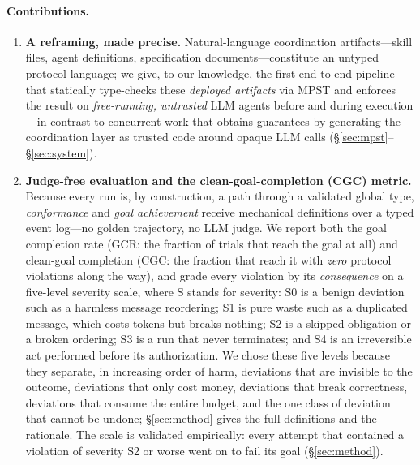 \documentclass{article}
\begin{document}
\paragraph{Contributions.}
\begin{enumerate}\itemsep2pt
\item \textbf{A reframing, made precise.} Natural-language coordination artifacts---skill files, agent definitions, specification documents---constitute an untyped protocol language; we give, to our knowledge, the first end-to-end pipeline that statically type-checks these \emph{deployed artifacts} via MPST and enforces the result on \emph{free-running, untrusted} LLM agents before and during execution---in contrast to concurrent work that obtains guarantees by generating the coordination layer as trusted code around opaque LLM calls \citep{bollig26} (\S\ref{sec:mpst}--\S\ref{sec:system}).
\item \textbf{Judge-free evaluation and the clean-goal-completion (CGC) metric.} Because every run is, by construction, a path through a validated global type, \emph{conformance} and \emph{goal achievement} receive mechanical definitions over a typed event log---no golden trajectory, no LLM judge. We report both the goal completion rate (GCR: the fraction of trials that reach the goal at all) and clean-goal completion (CGC: the fraction that reach it with \emph{zero} protocol violations along the way), and grade every violation by its \emph{consequence} on a five-level severity scale, where S stands for severity: S0 is a benign deviation such as a harmless message reordering; S1 is pure waste such as a duplicated message, which costs tokens but breaks nothing; S2 is a skipped obligation or a broken ordering; S3 is a run that never terminates; and S4 is an irreversible act performed before its authorization. We chose these five levels because they separate, in increasing order of harm, deviations that are invisible to the outcome, deviations that only cost money, deviations that break correctness, deviations that consume the entire budget, and the one class of deviation that cannot be undone; \S\ref{sec:method} gives the full definitions and the rationale. The scale is validated empirically: every attempt that contained a violation of severity S2 or worse went on to fail its goal (\S\ref{sec:method}).

\end{enumerate}
\end{document}
